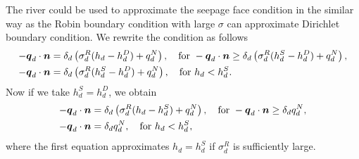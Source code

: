 The river could be used to approximate the seepage face condition in the similar way as the Robin boundary condition with large $\sigma$ 
can approximate Dirichlet boundary condition. We rewrite the condition as follows
\begin{align}
  -\mathbf{\boldsymbol{q}}_d \cdot \mathbf{\boldsymbol{n}} &= \delta_d\left(\sigma_d^R ( h_d - h_d^D) + q_d^N\right), \quad \text{for } -\mathbf{\boldsymbol{q}}_d \cdot \mathbf{\boldsymbol{n}} \ge \delta_d\left(\sigma_d^R ( h_d^S - h_d^D) + q_d^N\right),\\
  -\mathbf{\boldsymbol{q}}_d \cdot \mathbf{\boldsymbol{n}} &= \delta_d\left(\sigma_d^R ( h_d^S - h_d^D)+q_d^N\right), \quad \text{for } h_d < h_d^S.
\end{align}
Now if we take $h_d^S=h_d^D$, we obtain
\begin{align}
  -\mathbf{\boldsymbol{q}}_d \cdot \mathbf{\boldsymbol{n}} &= \delta_d\left(\sigma_d^R ( h_d - h_d^S) + q_d^N\right), \quad \text{for } -\mathbf{\boldsymbol{q}}_d \cdot \mathbf{\boldsymbol{n}} \ge \delta_d q_d^N,\\
  -\mathbf{\boldsymbol{q}}_d \cdot \mathbf{\boldsymbol{n}} &= \delta_d q_d^N, \quad \text{for } h_d < h_d^S,
\end{align}
where the first equation approximates $h_d = h_d^S$ if $\sigma_d^R$ is sufficiently large.




